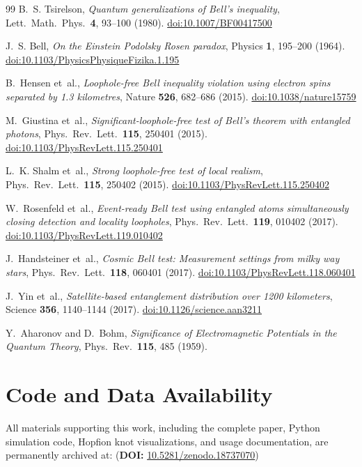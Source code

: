 \documentclass[11pt,a4paper]{article}
\theoremstyle{definition}
\theoremstyle{remark}
\begin{document}
\begin{thebibliography}{99}
B.~S. Tsirelson,
\textit{Quantum generalizations of Bell's inequality},
Lett.\ Math.\ Phys.\ \textbf{4}, 93--100 (1980).
\href{https://doi.org/10.1007/BF00417500}{doi:10.1007/BF00417500}

J.~S. Bell,
\textit{On the Einstein Podolsky Rosen paradox},
Physics \textbf{1}, 195--200 (1964).
\href{https://doi.org/10.1103/PhysicsPhysiqueFizika.1.195}{doi:10.1103/PhysicsPhysiqueFizika.1.195}

B.~Hensen et~al.,
\textit{Loophole-free Bell inequality violation using electron spins separated by 1.3 kilometres},
Nature \textbf{526}, 682--686 (2015).
\href{https://doi.org/10.1038/nature15759}{doi:10.1038/nature15759}

M.~Giustina et~al.,
\textit{Significant-loophole-free test of Bell's theorem with entangled photons},
Phys.\ Rev.\ Lett.\ \textbf{115}, 250401 (2015).
\href{https://doi.org/10.1103/PhysRevLett.115.250401}{doi:10.1103/PhysRevLett.115.250401}

L.~K. Shalm et~al.,
\textit{Strong loophole-free test of local realism},
Phys.\ Rev.\ Lett.\ \textbf{115}, 250402 (2015).
\href{https://doi.org/10.1103/PhysRevLett.115.250402}{doi:10.1103/PhysRevLett.115.250402}

W.~Rosenfeld et~al.,
\textit{Event-ready Bell test using entangled atoms simultaneously closing detection and locality loopholes},
Phys.\ Rev.\ Lett.\ \textbf{119}, 010402 (2017).
\href{https://doi.org/10.1103/PhysRevLett.119.010402}{doi:10.1103/PhysRevLett.119.010402}

J.~Handsteiner et~al.,
\textit{Cosmic Bell test: Measurement settings from milky way stars},
Phys.\ Rev.\ Lett.\ \textbf{118}, 060401 (2017).
\href{https://doi.org/10.1103/PhysRevLett.118.060401}{doi:10.1103/PhysRevLett.118.060401}

J.~Yin et~al.,
\textit{Satellite-based entanglement distribution over 1200 kilometers},
Science \textbf{356}, 1140--1144 (2017).
\href{https://doi.org/c}{doi:10.1126/science.aan3211}

Y.~Aharonov and D.~Bohm,
\textit{Significance of Electromagnetic Potentials in the Quantum Theory},
Phys.\ Rev.\ \textbf{115}, 485 (1959).

\end{thebibliography}

\newpage
\appendix
\section{Code and Data Availability}
\label{P8:sec:code_availability}

All materials supporting this work, including the complete paper, Python simulation code, Hopfion knot visualizations, and usage documentation, are permanently archived at: \cite{Paper8} (\textbf{DOI:} \href{https://doi.org/10.5281/zenodo.18737070}{10.5281/zenodo.18737070})
\end{document}
